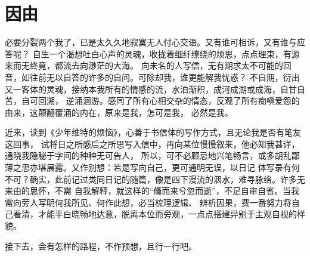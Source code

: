 \part{因由}

\vspace*{2\ccwd}

\hspace*{2em} 必要分裂两个我了，已是太久久地寂寞无人付心交语。又有谁可相诉，又有谁与应答呢？
自生一个渴想吐白心声的灵魂，收拢着细纤缭绕的烦思，点点理束，有源来而无终竟，都流去向渺茫的大海。
向未名的人写信，无有期求太不可能的回音，如往前无以自答的许多的自问。可除却我，谁更能解我忧惑？
不自期，衍出又一客体的灵魂，接纳本我所有的情感的流，水泊渐积，成河成湖或成海，自甘自苦，自可回溯，
逆涌洄游。感同了所有心相交杂的情态，反观了所有痴嗔爱怨的由来，这颠翻覆涌的内在，原来是我，怎可是我，
必然是我。

\vspace*{2\ccwd}

\hspace*{2em} 近来，读到《少年维特的烦恼》，心善于书信体的写作方式，且无论我是否有笔友这回事，
试将日之所感后之所思写入信中，再向某位慢慢叙来，他必知我甚详，通晓我隐秘于字间的种种无可告人，
所以，可不必顾忌地兴笔畅言，或多胡乱鄙薄之思亦堪展露。又作别想：若是写向自己，更可通明无误，以日记
体写录有何不可？确实，此前记过类同日记的随篇，像是四下漫流的洇水，难寻脉络。许多无来由的思怀，不需
自我解释，就这样的“儵而来兮忽而逝”，不足自审自省。当我需向旁人写明何我所见、何作此想，必当梳理逻辑、
辨析因果，费一番努力将自己看清，才能平白晓畅地达意，脱离本位而旁观，一点点搭建异别于主观自视的样貌。

\vspace*{2\ccwd}

\hspace*{2em} 接下去，会有怎样的路程，不作预想，且行一行吧。
\newpage